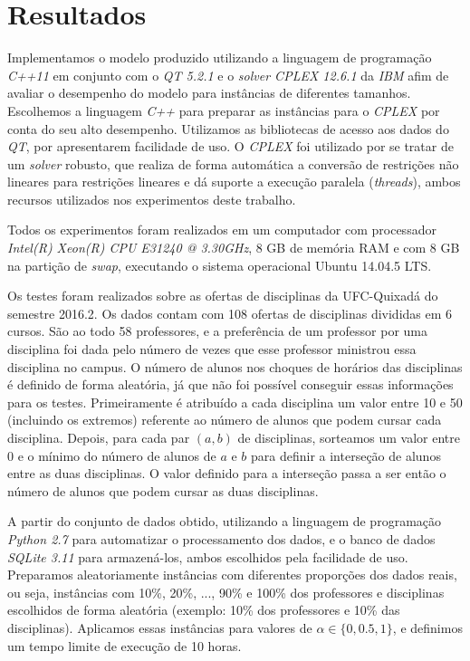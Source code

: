 \chapter{Resultados}
\label{chap:resultados}

Implementamos o modelo produzido utilizando a linguagem de programação \textit{C++11} \cite{c++} em conjunto com o \textit{QT 5.2.1} \cite{qt} e o \textit{solver CPLEX 12.6.1} da \textit{IBM} \cite{ibmcplex} afim de avaliar o desempenho do modelo para instâncias de diferentes tamanhos. Escolhemos a linguagem \textit{C++} para preparar as instâncias para o \textit{CPLEX} por conta do seu alto desempenho. Utilizamos as bibliotecas de acesso aos dados do \textit{QT}, por apresentarem facilidade de uso. O \textit{CPLEX} foi utilizado por se tratar de um \textit{solver} robusto, que realiza de forma automática a conversão de restrições não lineares para restrições lineares e dá suporte a execução paralela (\textit{threads}), ambos recursos utilizados nos experimentos deste trabalho.

Todos os experimentos foram realizados em um computador com processador \textit{Intel(R) Xeon(R) CPU E31240 @ 3.30GHz}, 8 GB de memória RAM e com 8 GB na partição de \textit{swap}, executando o sistema operacional Ubuntu 14.04.5 LTS.

Os testes foram realizados sobre as ofertas de disciplinas da UFC-Quixadá do semestre 2016.2. Os dados contam com 108 ofertas de disciplinas divididas em 6 cursos. São ao todo 58 professores, e a preferência de um professor por uma disciplina foi dada pelo número de vezes que esse professor ministrou essa disciplina no campus. O número de alunos nos choques de horários das disciplinas é definido de forma aleatória, já que não foi possível conseguir essas informações para os testes. Primeiramente é atribuído a cada disciplina um valor entre 10 e 50 (incluindo os extremos) referente ao número de alunos que podem cursar cada disciplina. Depois, para cada par $(a, b)$ de disciplinas, sorteamos um valor entre 0 e o mínimo do número de alunos de $a$ e $b$ para definir a interseção de alunos entre as duas disciplinas. O valor definido para a interseção passa a ser então o número de alunos que podem cursar as duas disciplinas.

A partir do conjunto de dados obtido, utilizando a linguagem de programação \textit{Python 2.7} \cite{python} para automatizar o processamento dos dados, e o banco de dados \textit{SQLite 3.11} \cite{sqlite} para armazená-los, ambos escolhidos pela facilidade de uso. Preparamos aleatoriamente instâncias com diferentes proporções dos dados reais, ou seja, instâncias com 10\%, 20\%, ..., 90\% e 100\% dos professores e disciplinas escolhidos de forma aleatória (exemplo: 10\% dos professores e 10\% das disciplinas). Aplicamos essas instâncias para valores de $\alpha \in{\{0, 0.5, 1\}}$, e definimos um tempo limite de execução de 10 horas.

